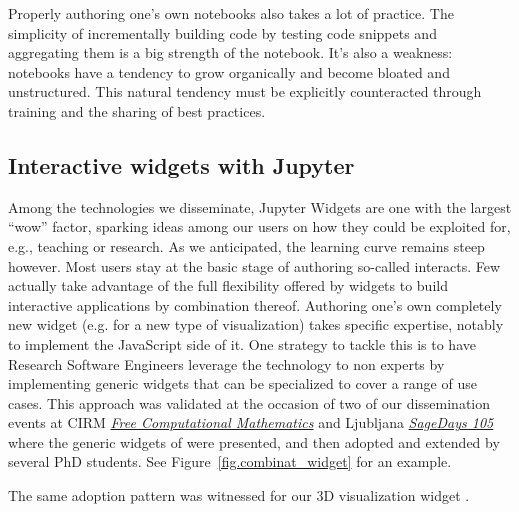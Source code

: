 \documentclass{deliverablereport}
\begin{document}
Properly authoring one's own notebooks also takes a lot of practice.
The simplicity of incrementally building code by testing code snippets
and aggregating them is a big strength of the notebook. It's also a
weakness: notebooks have a tendency to grow organically and become
bloated and unstructured. This natural tendency must be explicitly
counteracted through training and the sharing of best practices.

\subsection{Interactive widgets with Jupyter}

Among the technologies we disseminate, Jupyter Widgets are one with
the largest ``wow'' factor, sparking ideas among our users on how they
could be exploited for, e.g., teaching or research. As we anticipated,
the learning curve remains steep however. Most users stay at the basic
stage of authoring so-called interacts. Few actually take advantage of
the full flexibility offered by widgets to build interactive
applications by combination thereof. Authoring one's own completely
new widget (e.g. for a new type of visualization) takes specific
expertise, notably to implement the JavaScript side of it. One
strategy to tackle this is to have Research Software Engineers leverage
the technology to non experts by implementing generic widgets that can
be specialized to cover a range of use cases. This approach was
validated at the occasion of two of our dissemination events at CIRM
\href{https://conferences.cirm-math.fr/1978.html}{\emph{Free
Computational Mathematics}} and Ljubljana
\href{https://wiki.sagemath.org/fpsac19}{\emph{SageDays 105}} where
the generic widgets of 
were presented, and then adopted and extended by several PhD students.
See Figure~\ref{fig.combinat_widget} for an example.

The same adoption pattern was witnessed for our 3D visualization
widget .
\end{document}
